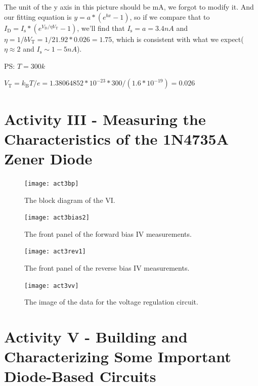 \documentclass[11pt]{article}
\begin{document}
The unit of the y axis in this picture should be mA, we forgot to modify it. And our fitting equation is $y=a*(e^{bx}-1)$, so if we compare that to $I_{\mathrm {D} }=I_{\mathrm {s} }*(e^{V_{\mathrm {D} }/ \eta V_{\mathrm {T} }}-1)$, we'll find that $I_{\mathrm {s} }=a=3.4 nA$ and $\eta=1/{bV_{\mathrm {T} }}=1/{21.92*0.026}=1.75$, which is consistent with what we expect($ \eta \approx 2$ and $I_{\mathrm {s} }\sim 1-5 nA$).

PS: $T=300k$

$V_{\mathrm {T} }=k_{\mathrm {B} }T/e=1.38064852*10^{-23}*300/(1.6*10^{-19})=0.026$



\section{Activity III - Measuring the Characteristics of the 1N4735A Zener Diode}



\begin{figure}[H]
 \begin{center}
  \texttt{[image: act3bp]}
  \caption{The block diagram of the VI.}
  \label{fig:act3bp}
 \end{center}
\end{figure}

\begin{figure}[H]
 \begin{center}
  \texttt{[image: act3bias2]}
  \caption{The front panel of the forward bias IV measurements.}
  \label{fig:act3bias2}
 \end{center}
\end{figure}

\begin{figure}[H]
 \begin{center}
  \texttt{[image: act3rev1]}
  \caption{The front panel of the reverse bias IV measurements.}
  \label{fig:act3rev1}
 \end{center}
\end{figure}

\begin{figure}[H]
 \begin{center}
  \texttt{[image: act3vv]}
  \caption{The image of the data for the voltage regulation circuit.}
  \label{fig:act3vv}
 \end{center}
\end{figure}

\section{Activity V - Building and Characterizing Some Important Diode-Based Circuits}
\end{document}
